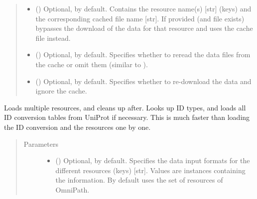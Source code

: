 \documentclass[letterpaper,10pt,english]{sphinxmanual}
\begin{document}
\begin{fulllineitems}
\begin{fulllineitems}
\begin{quote}
\begin{description}
\begin{itemize}
\item {} 
 () \textendash{} Optional, \sphinxcode{\sphinxupquote{\{\}}} by default. Contains the resource name(s)
{[}str{]} (keys) and the corresponding cached file name {[}str{]}.
If provided (and file exists) bypasses the download of the
data for that resource and uses the cache file instead.

\item {} 
 () \textendash{} Optional,  by default. Specifies whether to reread
the data files from the cache or omit them (similar to
).

\item {} 
 () \textendash{} Optional,  by default. Specifies whether to
re-download the data and ignore the cache.

\end{itemize}

\end{description}\end{quote}

\end{fulllineitems}


\begin{fulllineitems}
\label{\detokenize{main:pypath.main.PyPath.load_resources}}
Loads multiple resources, and cleans up after. Looks up ID
types, and loads all ID conversion tables from UniProt if
necessary. This is much faster than loading the ID conversion
and the resources one by one.
\begin{quote}\begin{description}
\item[{Parameters}] \leavevmode\begin{itemize}
\item {} 
 () \textendash{} Optional,  by default. Specifies the data input
formats for the different resources (keys) {[}str{]}. Values
are  instances
containing the information. By default uses the set of
resources of OmniPath.


\end{itemize}
\end{description}
\end{quote}
\end{fulllineitems}
\end{fulllineitems}
\end{document}
